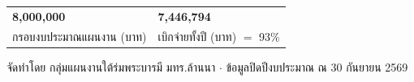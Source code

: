 \begin{titlepage}
\begin{center}
\vspace{14pt}
\setlength{\tabcolsep}{9pt}
\begin{tabular}{>{\centering\arraybackslash}p{5.2cm}>{\centering\arraybackslash}p{5.2cm}}
\rowcolor{headerblue}
{\color{FirstBlue}\LARGE\bfseries 8,000,000} & {\color{FirstBlue}\LARGE\bfseries 7,446,794}\\
\rowcolor{headerblue}
{\footnotesize กรอบงบประมาณแผนงาน (บาท)} & {\footnotesize เบิกจ่ายทั้งปี (บาท) $=$ 93\%}\\
\end{tabular}
\end{center}

\vfill
{\footnotesize จัดทำโดย กลุ่มแผนงานใต้ร่มพระบารมี มทร.ล้านนา $\cdot$ ข้อมูลปิดปีงบประมาณ ณ 30 กันยายน 2569}
\end{titlepage}
